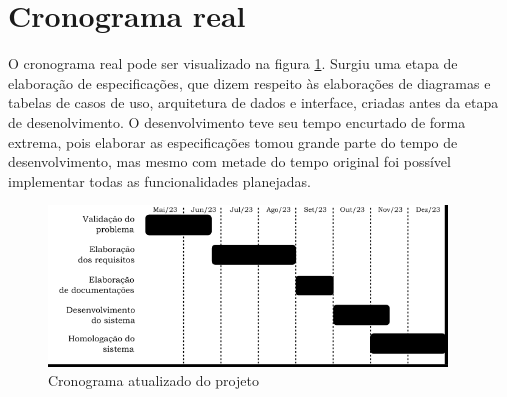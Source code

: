 \section{Cronograma real}

O cronograma real pode ser visualizado na figura \ref{fig:cronograma-atualizado}. Surgiu uma etapa de elaboração de especificações, que dizem respeito às elaborações de diagramas e tabelas de casos de uso, arquitetura de dados e interface, criadas antes da etapa de desenolvimento. O desenvolvimento teve seu tempo encurtado de forma extrema, pois elaborar as especificações tomou grande parte do tempo de desenvolvimento, mas mesmo com metade do tempo original foi possível implementar todas as funcionalidades planejadas.


\begin{figure}[ht]
    \begin{center}
    \includegraphics[width=300pt]{figuras/cronograma-atualizado}
    \caption{Cronograma atualizado do projeto}
    \label{fig:cronograma-atualizado}
    \end{center}
\end{figure}

